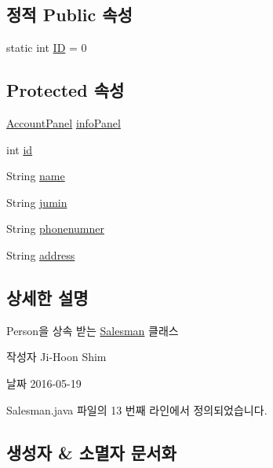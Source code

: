 \subsection*{정적 Public 속성}
\begin{DoxyCompactItemize}
\item 
static int \hyperlink{classpkg_1_1_person_af93c4dddd917c1fd77adc3eb68af3e54}{ID} = 0
\end{DoxyCompactItemize}
\subsection*{Protected 속성}
\begin{DoxyCompactItemize}
\item 
\hyperlink{classpkg_1_1_account_panel}{Account\+Panel} \hyperlink{classpkg_1_1_person_a4a1890f00be07d1bc4e3e9df16425210}{info\+Panel}
\item 
int \hyperlink{classpkg_1_1_person_acd3bca96258af32adc1eca89b74222a6}{id}
\item 
String \hyperlink{classpkg_1_1_person_a37fd1fe3cf039df98ffca54df6002bb6}{name}
\item 
String \hyperlink{classpkg_1_1_person_aef72766ac67a0af8074b513d00c523f8}{jumin}
\item 
String \hyperlink{classpkg_1_1_person_aa7a67349f91a08a8cc45067354653c1d}{phonenumner}
\item 
String \hyperlink{classpkg_1_1_person_a692aadebf7edf808fbcbacbcaed07ef3}{address}
\end{DoxyCompactItemize}


\subsection{상세한 설명}
Person을 상속 받는 \hyperlink{classpkg_1_1_salesman}{Salesman} 클래스 

\begin{DoxyAuthor}{작성자}
Ji-\/\+Hoon Shim 
\end{DoxyAuthor}
\begin{DoxyDate}{날짜}
2016-\/05-\/19 
\end{DoxyDate}


Salesman.\+java 파일의 13 번째 라인에서 정의되었습니다.



\subsection{생성자 \& 소멸자 문서화}
